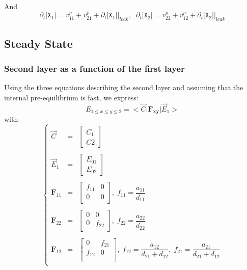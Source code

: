 \documentclass[aps,onecolumn,11pt]{revtex4}
\newcommand{\mychem}[1]{\mathtt{#1}}
\newcommand{\myconc}[1]{\big[#1\big]}
\newcommand{\spx}{\mychem{X}}
\newcommand{\mymat}[1]{{\bm{#1}}}
\begin{document}
And
\begin{equation}
	\partial_t \myconc{\spx_1} = v^p_{11}+v^p_{21} + \partial_t \myconc{\spx_1}\vert_{leak},\;\;
	\partial_t \myconc{\spx_2} = v^p_{22}+v^p_{12} + \partial_t \myconc{\spx_2}\vert_{leak}
\end{equation}

\subsection{Steady State}

\subsubsection{Second layer as a function of the first layer}


Using the three equations describing the second layer and assuming that the internal pre-equilibrium is fast, we express:
\begin{equation}
\boxed{
E_{1\leq x \leq y \leq 2 } = <{\vec{C}} \vert \mymat{F_{xy}} \vert \vec{E}_1 >
}
\end{equation}
with
\begin{equation}
\left\lbrace
\begin{array}{rcl}
\vec{C}   & = & \begin{bmatrix} C_1 \\ C2 \end{bmatrix}\\
\\
\vec{E}_1 & = & \begin{bmatrix} E_{01} \\ E_{02} \end{bmatrix}\\
\\
\mymat{F}_{11} & = & 
\begin{bmatrix}
	f_{11} & 0 \\
	0 & 0\\
\end{bmatrix}, \; f_{11} = \dfrac{a_{11}}{d_{11}}\\
\\
\mymat{F}_{22} & = & 
\begin{bmatrix}
	0 & 0 \\
	0 & f_{22}\\
\end{bmatrix}, \; f_{22} = \dfrac{a_{22}}{d_{22}}\\
\\
\mymat{F}_{12} & = & 
\begin{bmatrix}
	0 & f_{21}\\
	f_{12} & 0\\
\end{bmatrix}, \; f_{12} = \dfrac{a_{12}}{d_{21}+d_{12}},\; f_{21} = \dfrac{a_{21}}{d_{21}+d_{12}}\\
\end{array}
\right.
\end{equation}
\end{document}
